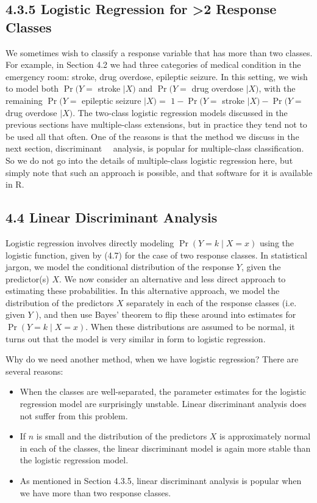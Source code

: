 \documentclass[10pt]{article}
\begin{document}
\subsection*{4.3.5 Logistic Regression for >2 Response Classes}
We sometimes wish to classify a response variable that has more than two classes. For example, in Section 4.2 we had three categories of medical condition in the emergency room: stroke, drug overdose, epileptic seizure. In this setting, we wish to model both $\operatorname{Pr}(Y=$ stroke $\mid X)$ and $\operatorname{Pr}(Y=$ drug overdose $\mid X)$, with the remaining $\operatorname{Pr}(Y=$ epileptic seizure $\mid X)=$ $1-\operatorname{Pr}(Y=$ stroke $\mid X)-\operatorname{Pr}(Y=$ drug overdose $\mid X)$. The two-class logistic regression models discussed in the previous sections have multiple-class extensions, but in practice they tend not to be used all that often. One of the reasons is that the method we discuss in the next section, discriminant\
\
analysis, is popular for multiple-class classification. So we do not go into the details of multiple-class logistic regression here, but simply note that such an approach is possible, and that software for it is available in R.

\subsection*{4.4 Linear Discriminant Analysis}
Logistic regression involves directly modeling $\operatorname{Pr}(Y=k \mid X=x)$ using the logistic function, given by (4.7) for the case of two response classes. In statistical jargon, we model the conditional distribution of the response $Y$, given the predictor(s) $X$. We now consider an alternative and less direct approach to estimating these probabilities. In this alternative approach, we model the distribution of the predictors $X$ separately in each of the response classes (i.e. given $Y$ ), and then use Bayes' theorem to flip these around into estimates for $\operatorname{Pr}(Y=k \mid X=x)$. When these distributions are assumed to be normal, it turns out that the model is very similar in form to logistic regression.

Why do we need another method, when we have logistic regression? There are several reasons:

\begin{itemize}
  \item When the classes are well-separated, the parameter estimates for the logistic regression model are surprisingly unstable. Linear discriminant analysis does not suffer from this problem.
  \item If $n$ is small and the distribution of the predictors $X$ is approximately normal in each of the classes, the linear discriminant model is again more stable than the logistic regression model.
  \item As mentioned in Section 4.3.5, linear discriminant analysis is popular when we have more than two response classes.
\end{itemize}
\end{document}
